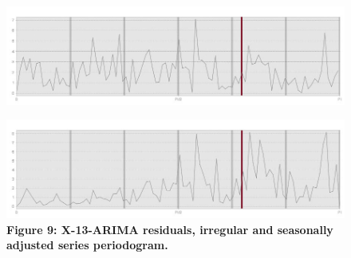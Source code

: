 \documentclass{article}
\begin{document}
\begin{figure}[H]
  \includegraphics[width=\linewidth]{../images/capitolo3/XperIRR.jpg} 
  \label{fig:1}
\end{figure}
\begin{figure}[H]
  \includegraphics[width=\linewidth]{../images/capitolo3/XperSA.jpg} 
   {\textbf{\scriptsize Figure 9:  X-13-ARIMA residuals, irregular and seasonally adjusted series periodogram. }}
  \label{fig:1}
\end{figure}
\end{document}

